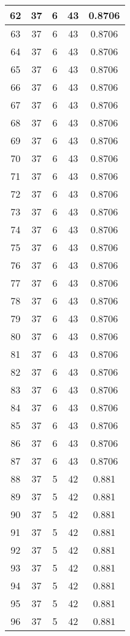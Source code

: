\documentclass[letterpaper, 12pt]{article}
\begin{document}
\begin{longtable}{|c|c|c|c|c|}
\hline
62 & 37 & 6 & 43 & 0.8706 \\
\hline
63 & 37 & 6 & 43 & 0.8706 \\
\hline
64 & 37 & 6 & 43 & 0.8706 \\
\hline
65 & 37 & 6 & 43 & 0.8706 \\
\hline
66 & 37 & 6 & 43 & 0.8706 \\
\hline
67 & 37 & 6 & 43 & 0.8706 \\
\hline
68 & 37 & 6 & 43 & 0.8706 \\
\hline
69 & 37 & 6 & 43 & 0.8706 \\
\hline
70 & 37 & 6 & 43 & 0.8706 \\
\hline
71 & 37 & 6 & 43 & 0.8706 \\
\hline
72 & 37 & 6 & 43 & 0.8706 \\
\hline
73 & 37 & 6 & 43 & 0.8706 \\
\hline
74 & 37 & 6 & 43 & 0.8706 \\
\hline
75 & 37 & 6 & 43 & 0.8706 \\
\hline
76 & 37 & 6 & 43 & 0.8706 \\
\hline
77 & 37 & 6 & 43 & 0.8706 \\
\hline
78 & 37 & 6 & 43 & 0.8706 \\
\hline
79 & 37 & 6 & 43 & 0.8706 \\
\hline
80 & 37 & 6 & 43 & 0.8706 \\
\hline
81 & 37 & 6 & 43 & 0.8706 \\
\hline
82 & 37 & 6 & 43 & 0.8706 \\
\hline
83 & 37 & 6 & 43 & 0.8706 \\
\hline
84 & 37 & 6 & 43 & 0.8706 \\
\hline
85 & 37 & 6 & 43 & 0.8706 \\
\hline
86 & 37 & 6 & 43 & 0.8706 \\
\hline
87 & 37 & 6 & 43 & 0.8706 \\
\hline
88 & 37 & 5 & 42 & 0.881 \\
\hline
89 & 37 & 5 & 42 & 0.881 \\
\hline
90 & 37 & 5 & 42 & 0.881 \\
\hline
91 & 37 & 5 & 42 & 0.881 \\
\hline
92 & 37 & 5 & 42 & 0.881 \\
\hline
93 & 37 & 5 & 42 & 0.881 \\
\hline
94 & 37 & 5 & 42 & 0.881 \\
\hline
95 & 37 & 5 & 42 & 0.881 \\
\hline
96 & 37 & 5 & 42 & 0.881 \\

\end{longtable}
\end{document}
